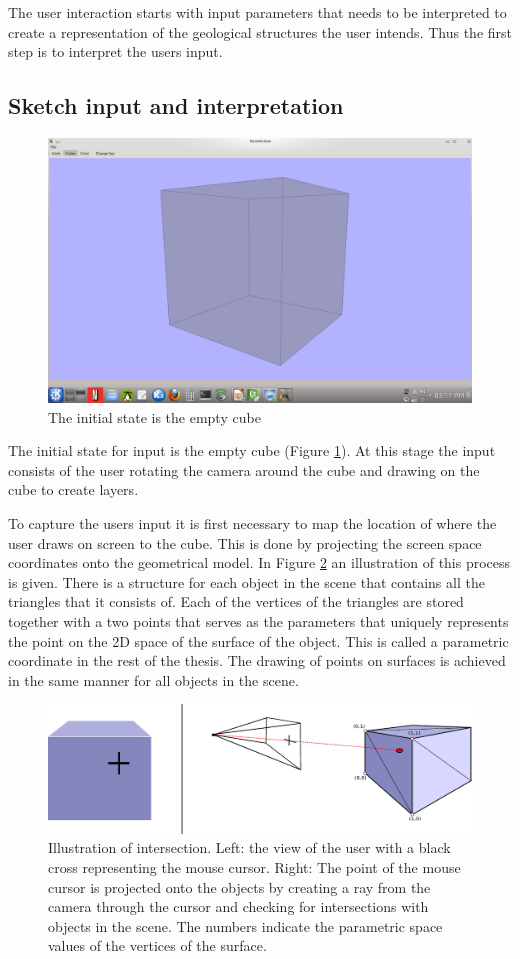 \documentclass[a4paper,12pt]{report}
\begin{document}
The user interaction starts with input parameters that needs to be interpreted to create a representation of the geological structures the user intends. Thus the first step is to interpret the users input.

\subsection{Sketch input and interpretation}

\begin{figure}
\centering
 \includegraphics[trim = 50mm 30mm 50mm 30mm, clip,width=0.5\linewidth]{thesis/emptyCube.png}
 \caption{The initial state is the empty cube}
 \label{fig:emptyCube}
\end{figure}
The initial state for input is the empty cube (Figure \ref{fig:emptyCube}). At this stage the input consists of the user rotating the camera around the cube and drawing on the cube to create layers. 

 To capture the users input it is first necessary to map the location of where the user draws on screen to the cube.  This is done by projecting the screen space coordinates onto the geometrical model. In Figure \ref{fig:intersect} an illustration of this process is given. There is a structure for each object in the scene that contains all the triangles that it consists of. Each of the vertices of the triangles are stored together with a two points that serves as the parameters that uniquely represents the point on the 2D space of the surface of the object. This is called a parametric coordinate in the rest of the thesis. The drawing of points on surfaces is achieved in the same manner for all objects in the scene.
 
 \begin{figure}
\centering
 \includegraphics[width=\linewidth]{thesis/intersection.pdf}
 \caption{Illustration of intersection. Left: the view of the user with a black cross representing the mouse cursor. Right: The point of the mouse cursor is projected onto the objects by creating a ray from the camera through the cursor and checking for intersections with objects in the scene. The numbers indicate the parametric space values of the vertices of the surface.}
 \label{fig:intersect}
\end{figure}
 
\end{document}
